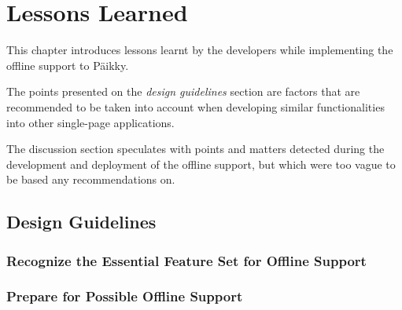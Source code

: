 \chapter{Lessons Learned}

This chapter introduces lessons learnt by the developers while implementing the offline support to Päikky. 

The points presented on the \textit{design guidelines} section are factors that are recommended to be taken into account when developing similar functionalities into other single-page applications.

The discussion section speculates with points and matters detected during the development and deployment of the offline support, but which were too vague to be based any recommendations on. 




\section{Design Guidelines}




\subsection{Recognize the Essential Feature Set for Offline Support}



\subsection{Prepare for Possible Offline Support}







